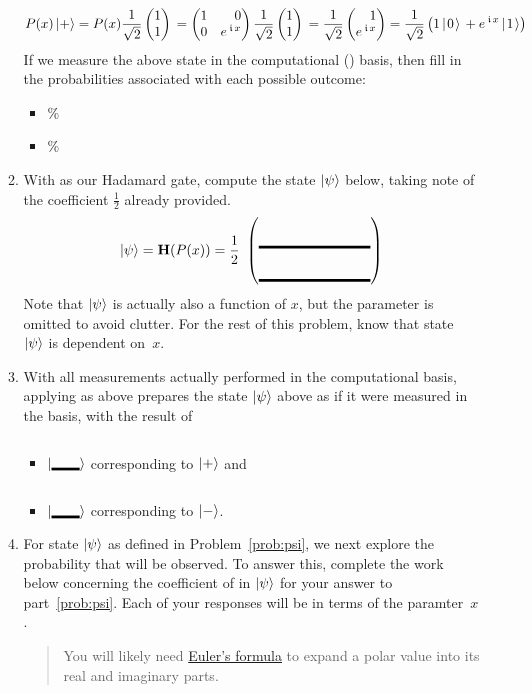 \documentclass[12pt]{article}
\begin{document}
\begin{enumerate}
\begin{enumerate}[label=\theenumi.\arabic*]
\[  P(x)\ket{+} = P(x)\PPlus{}= \SQBG{\relax}{1}{0}{0}{\ExpPhase{x}}\PPlus{} =\RootTwo{}\SQB{1}{\ExpPhase{x}} = \TwoSupOp{1\QZero{}}{\ExpPhase{x}\QOne}{+}
  \]
  If we measure the above state in the computational (\PauliZ{}) basis, then fill in the probabilities associated with each possible outcome:
  \begin{itemize}
      \item \QZero{} \Blank{}\%
      \item \QOne{} \Blank{}\%
  \end{itemize}
  \item\label{prob:psi} With \Hadamard{} as our Hadamard gate, compute the state $\ket{\psi}$ below, taking note of the coefficient $\frac{1}{2}$ already provided.
  \[
  \ket{\psi} = \Hadamard(P(x)) = \frac{1}{2}\ \SQB{\Blank[8em]}{\Blank[8em]}
  \]
  Note that $\ket{\psi}$ is actually also a function of $x$, but the parameter is omitted to avoid clutter.  For the rest of this problem, know that state~$\ket{\psi}$ is dependent on~$x$.
  \item With all measurements actually performed in the computational basis, applying \Hadamard{} as above prepares the state $\ket{\psi}$ above as if it were measured in the \Blank[2em]{} basis, with the result of \begin{itemize}
      \item $\ket{\Blank[2em]}$ corresponding to $\ket{+}$ and 
      \item $\ket{\Blank[2em]}$  corresponding to $\ket{-}$.
   \end{itemize}
  \item For state $\ket{\psi}$ as defined in Problem~\ref{prob:psi}, we next explore the probability that \QZero{} will be observed.  To answer this, complete the work below concerning the coefficient of \QZero{} in $\ket{\psi}$ for your answer to part~\ref{prob:psi}.  Each of your responses will be in terms of the paramter~$x$.
  \begin{quote}
  You will likely need \href{https://en.wikipedia.org/wiki/Euler%27s_formula}{Euler's formula} to expand a polar value into its real and imaginary parts. 
  \end{quote} 
  

\end{enumerate}
\end{enumerate}
\end{document}
